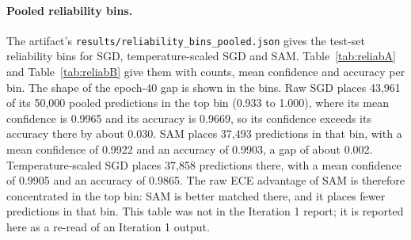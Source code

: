 \documentclass[11pt,letterpaper]{article}
\begin{document}
\paragraph{Pooled reliability bins.} The artifact's \texttt{results/reliability\_bins\_pooled.json} gives the test-set reliability bins for SGD, temperature-scaled SGD and SAM. Table~\ref{tab:reliabA} and Table~\ref{tab:reliabB} give them with counts, mean confidence and accuracy per bin. The shape of the epoch-40 gap is shown in the bins. Raw SGD places 43,961 of its 50,000 pooled predictions in the top bin (0.933 to 1.000), where its mean confidence is 0.9965 and its accuracy is 0.9669, so its confidence exceeds its accuracy there by about 0.030. SAM places 37,493 predictions in that bin, with a mean confidence of 0.9922 and an accuracy of 0.9903, a gap of about 0.002. Temperature-scaled SGD places 37,858 predictions there, with a mean confidence of 0.9905 and an accuracy of 0.9865. The raw ECE advantage of SAM is therefore concentrated in the top bin: SAM is better matched there, and it places fewer predictions in that bin. This table was not in the Iteration 1 report; it is reported here as a re-read of an Iteration 1 output.
\end{document}
